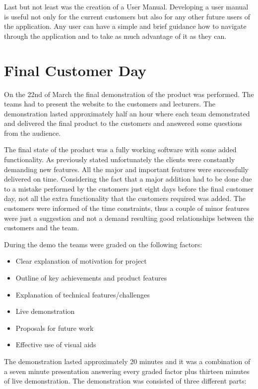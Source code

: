 \documentclass{l3proj}
\begin{document}
Last but not least was the creation of a User Manual. Developing a user manual is useful not only for the current customers but also for any other future users of the application. Any user can have a simple and brief guidance how to navigate through the application and to take as much advantage of it as they can.



\section{Final Customer Day}
\label{sec:finalDay}

On the 22nd of March the final demonstration of the product was performed. The teams had to present the website to the customers and lecturers. The demonstration lasted approximately half an hour where each team demonstrated and delivered the final product to the customers and answered some questions from the audience.

The final state of the product was a fully working software with some added functionality. As previously stated unfortunately the clients were constantly demanding new features. All the major and important features were successfully delivered on time. Considering the fact that a major addition had to be done due to a mistake performed by the customers just eight days before the final customer day, not all the extra functionality that the customers required was added. The customers were informed of the time constraints, thus a couple of minor features were just a suggestion and not a demand resulting good relationships between the customers and the team.

During the demo the teams were graded on the following factors:
\begin{itemize}
	\item Clear explanation of motivation for project
	\item Outline of key achievements and product features
	\item Explanation of technical features/challenges
	\item Live demonstration
	\item Proposals for future work
\item Effective use of visual aids
\end{itemize}
The demonstration lasted approximately 20 minutes and it was a combination of a seven minute presentation answering every graded factor plus thirteen minutes of live demonstration. The demonstration was consisted of three different parts:
\end{document}
